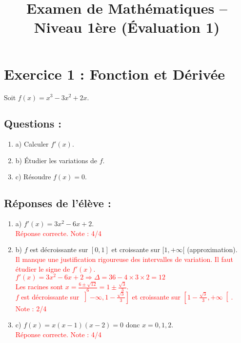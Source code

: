 \documentclass{article}
\begin{document}
\title{Examen de Mathématiques – Niveau 1ère (Évaluation 1)}
\maketitle

\section*{Exercice 1 : Fonction et Dérivée}

Soit $f(x) = x^3 - 3x^2 + 2x$. 

\subsection*{Questions :}
\begin{enumerate}
    \item a) Calculer $f'(x)$.
    \item b) Étudier les variations de $f$.
    \item c) Résoudre $f(x) = 0$.
\end{enumerate}

\subsection*{Réponses de l’élève :}
\begin{enumerate}
    \item a) $f'(x) = 3x^2 - 6x + 2$. \\
    \textcolor{red}{Réponse correcte. Note : 4/4}
    
    \item b) $f$ est décroissante sur $[0, 1]$ et croissante sur $[1, +\infty[$ (approximation). \\
    \textcolor{red}{Il manque une justification rigoureuse des intervalles de variation. Il faut étudier le signe de $f'(x)$. \\
    $f'(x) = 3x^2 - 6x + 2 \Rightarrow \Delta = 36 - 4 \times 3 \times 2 = 12$\\
    Les racines sont $x = \frac{6 \pm \sqrt{12}}{6} = 1 \pm \frac{\sqrt{3}}{3}$. \\
    $f$ est décroissante sur $\left] -\infty, 1 - \frac{\sqrt{3}}{3} \right]$ et croissante sur $\left[ 1 - \frac{\sqrt{3}}{3}, +\infty \right[$. \\
    Note : 2/4}
    
    \item c) $f(x) = x(x - 1)(x - 2) = 0$ donc $x = 0, 1, 2$. \\
    \textcolor{red}{Réponse correcte. Note : 4/4}
\end{enumerate}
\end{document}
